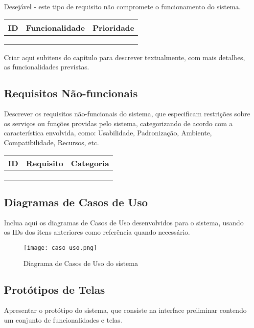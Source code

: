 \documentclass[a4paper,12pt]{article}
\begin{document}
Desejável - este tipo de requisito não compromete o funcionamento do sistema.

\begin{longtable}{|c|p{10cm}|c|}
    \hline
    \textbf{ID} & \textbf{Funcionalidade} & \textbf{Prioridade} \\
    \hline
     &  &  \\
    \hline
     &  &  \\
    \hline
     &  &  \\
    \hline
\end{longtable}

Criar aqui subitens do capítulo para descrever textualmente, com mais detalhes, as funcionalidades previstas.

\subsection{Requisitos Não-funcionais}
Descrever os requisitos não-funcionais do sistema, que especificam restrições sobre os serviços ou funções providas pelo sistema, categorizando de acordo com a característica envolvida, como: Usabilidade, Padronização, Ambiente, Compatibilidade, Recursos, etc.

\begin{longtable}{|c|p{10cm}|c|}
    \hline
    \textbf{ID} & \textbf{Requisito} & \textbf{Categoria} \\
    \hline
     &  &  \\
    \hline
     &  &  \\
    \hline
     &  &  \\
    \hline
\end{longtable}

\subsection{Diagramas de Casos de Uso}
Inclua aqui os diagramas de Casos de Uso desenvolvidos para o sistema, usando os IDs dos itens anteriores como referência quando necessário.

\begin{figure}[h]
    \centering
    \texttt{[image: caso\_uso.png]} %
    \caption{Diagrama de Casos de Uso do sistema}
    \label{fig:caso_uso}
\end{figure}

\clearpage

\subsection{Protótipos de Telas}
Apresentar o protótipo do sistema, que consiste na interface preliminar contendo um conjunto de funcionalidades e telas. 
\end{document}
